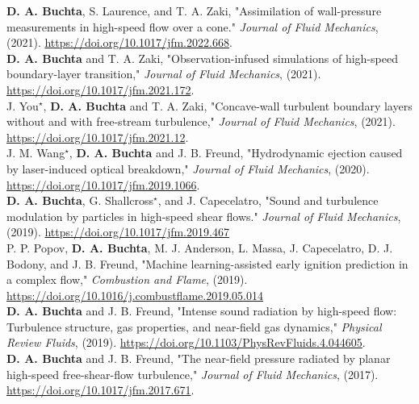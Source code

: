 \textbf{D. A. Buchta}, S. Laurence, and T. A. Zaki, "Assimilation of wall-pressure measurements in high-speed flow over a cone."
\textit{Journal of Fluid Mechanics}, (2021). \url{https://doi.org/10.1017/jfm.2022.668}.
\vspace{9pt}\\
\textbf{D. A. Buchta} and T. A. Zaki, "Observation-infused simulations of high-speed boundary-layer transition," \textit{Journal of Fluid Mechanics}, (2021). \url{https://doi.org/10.1017/jfm.2021.172}.
\vspace{9pt}\\
J. You$^\star$, \textbf{D. A. Buchta} and T. A. Zaki, "Concave-wall turbulent boundary layers without and with free-stream turbulence," \textit{Journal of Fluid Mechanics}, (2021). \url{https://doi.org/10.1017/jfm.2021.12}.
\vspace{9pt}\\
J. M. Wang$^\star$, \textbf{D. A. Buchta} and J. B. Freund, "Hydrodynamic ejection caused by laser-induced optical breakdown," \textit{Journal of Fluid Mechanics}, (2020). \url{https://doi.org/10.1017/jfm.2019.1066}.
\vspace{9pt}\\
\textbf{D. A. Buchta}, G. Shallcross$^\star$, and J. Capecelatro, "Sound and turbulence modulation by particles in high-speed shear flows." \textit{Journal of Fluid Mechanics}, (2019). \url{https://doi.org/10.1017/jfm.2019.467}
\vspace{9pt}\\
P. P. Popov, \textbf{D. A. Buchta}, M. J. Anderson, L. Massa, J. Capecelatro, D. J. Bodony, and J. B. Freund, "Machine learning-assisted early ignition prediction in a complex flow," \textit{Combustion and Flame}, (2019).\\ \url{https://doi.org/10.1016/j.combustflame.2019.05.014}
\vspace{9pt}\\
\textbf{D. A. Buchta} and J. B. Freund, "Intense sound radiation by high-speed flow: Turbulence structure, gas properties, and near-field gas dynamics," \textit{Physical Review Fluids}, (2019). \url{https://doi.org/10.1103/PhysRevFluids.4.044605}.\\
\vspace{9pt}
\textbf{D. A. Buchta} and J. B. Freund, "The near-field pressure radiated by planar high-speed free-shear-flow turbulence," \textit{Journal of Fluid Mechanics}, (2017). \url{https://doi.org/10.1017/jfm.2017.671}.
